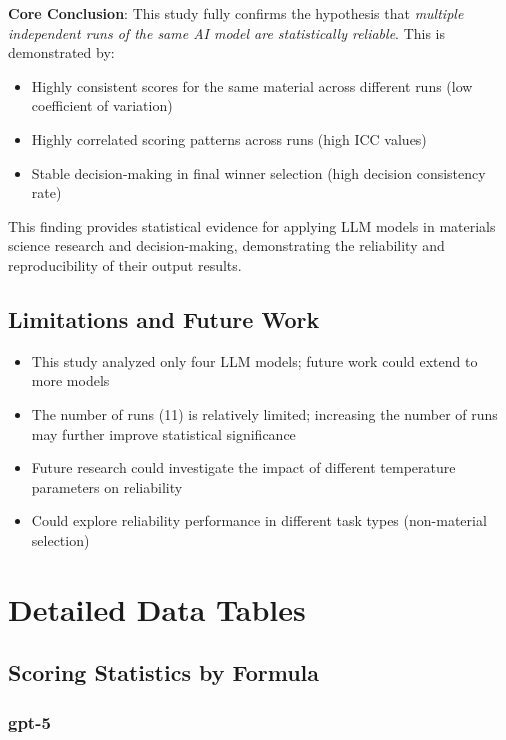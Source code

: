 \documentclass[12pt,a4paper]{article}
\begin{document}
\textbf{Core Conclusion}: This study fully confirms the hypothesis that \textit{multiple independent runs of the same AI model are statistically reliable}. This is demonstrated by:

\begin{itemize}
    \item Highly consistent scores for the same material across different runs (low coefficient of variation)
    \item Highly correlated scoring patterns across runs (high ICC values)
    \item Stable decision-making in final winner selection (high decision consistency rate)
\end{itemize}

This finding provides statistical evidence for applying LLM models in materials science research and decision-making, demonstrating the reliability and reproducibility of their output results.

\subsection{Limitations and Future Work}

\begin{itemize}
    \item This study analyzed only four LLM models; future work could extend to more models
    \item The number of runs (11) is relatively limited; increasing the number of runs may further improve statistical significance
    \item Future research could investigate the impact of different temperature parameters on reliability
    \item Could explore reliability performance in different task types (non-material selection)
\end{itemize}

\newpage


\appendix

\section{Detailed Data Tables}

\subsection{Scoring Statistics by Formula}

\subsubsection{gpt-5}
\end{document}

